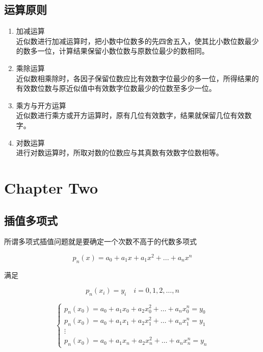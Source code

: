 \documentclass[12pt]{article}
\numberwithin{equation}{section}
\begin{document}
	\subsection{运算原则}
	\begin{enumerate}
        \item 加减运算  \\
		近似数进行加减运算时，把小数中位数多的先四舍五入，使其比小数位数最少的数多一位，计算结果保留小数位数与原数位最少的数相同。
        \item 乘除运算  \\
        近似数相乘除时，各因子保留位数应比有效数字位最少的多一位，所得结果的有效数位数与原近似值中有效数字位数最少的位数至多少一位。
        \item 乘方与开方运算  \\
        近似数进行乘方或开方运算时，原有几位有效数字，结果就保留几位有效数字。
        \item 对数运算  \\
        进行对数运算时，所取对数的位数应与其真数有效数字位数相等。
	\end{enumerate}

	\section{Chapter Two}

	\subsection{插值多项式}
	所谓多项式插值问题就是要确定一个次数不高于的代数多项式  

	\begin{equation}
		p_n (x) = a_0+a_1x + a_1x^2 +...+ a_nx^n
	\end{equation}  

	满足  

	\begin{equation}
		p_n (x_i) = y_i \quad i = 0, 1, 2, \ldots , n
	\end{equation}

	\begin{equation}
		\begin{cases}
			p_n (x_0) = a_0 + a_1 x_0 + a_2 x_0^2 + \ldots + a_n x_0^n = y_0  \\
			p_n (x_0) = a_0 + a_1 x_1 + a_2 x_1^2 + \ldots + a_n x_1^n = y_1 \\
			\vdots  \\
			p_n (x_0) = a_0 + a_1 x_n + a_2 x_n^2 + \ldots + a_n x_n^n = y_n
		\end{cases}
	\end{equation}
\end{document}
